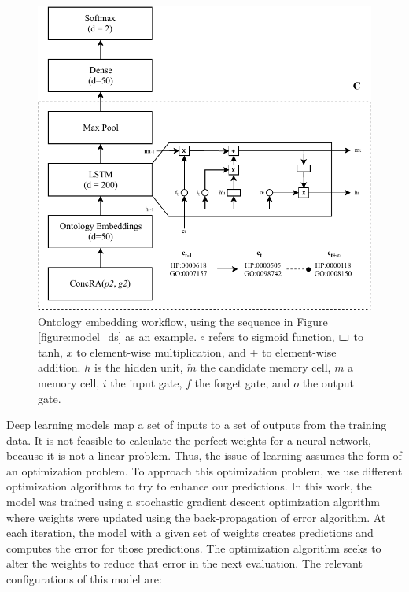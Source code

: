 \begin{figure}[ht]
\captionsetup{font=small}
\centering
\includegraphics[width=13cm]{images/lstm_detailed.pdf}
\fontsize{9}{10.8}\caption[Ontology Embeddings Workflow]{Ontology embedding workflow, using the sequence in Figure \ref{figure:model_ds} as an example. $\circ$ refers to sigmoid function, $\rectangle$ to tanh, $x$ to element-wise multiplication, and $+$ to element-wise addition. $h$ is the hidden unit, $\tilde{m}$ the candidate memory cell, $m$ a memory cell, $i$ the input gate, $f$ the forget gate, and $o$ the output gate.}
\label{figure:lstm_detailed}
\end{figure}

Deep learning models map a set of inputs to a set of outputs from the training data. It is not feasible to calculate the perfect weights for a neural network, because it is not a linear problem. Thus, the issue of learning assumes the form of an optimization problem. To approach this optimization problem, we use different optimization algorithms to try to enhance our predictions. In this work, the model was trained using a stochastic gradient descent optimization algorithm where weights were updated using the back-propagation of error algorithm. At each iteration, the model with a given set of weights creates predictions and computes the error for those predictions. The optimization algorithm seeks to alter the weights to reduce that error in the next evaluation. The relevant configurations of this model are:

